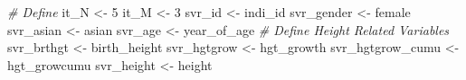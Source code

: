 \documentclass[
]{book}
\newenvironment{Shaded}{\begin{snugshade}}{\end{snugshade}}
\newcommand{\CommentTok}[1]{\textcolor[rgb]{0.56,0.35,0.01}{\textit{#1}}}
\newcommand{\DecValTok}[1]{\textcolor[rgb]{0.00,0.00,0.81}{#1}}
\newcommand{\NormalTok}[1]{#1}
\newcommand{\OtherTok}[1]{\textcolor[rgb]{0.56,0.35,0.01}{#1}}
\newcommand{\StringTok}[1]{\textcolor[rgb]{0.31,0.60,0.02}{#1}}
\begin{document}
\begin{Shaded}
\begin{Highlighting}[]
\CommentTok{\# Define}
\NormalTok{it\_N }\OtherTok{\textless{}{-}} \DecValTok{5}
\NormalTok{it\_M }\OtherTok{\textless{}{-}} \DecValTok{3}
\NormalTok{svr\_id }\OtherTok{\textless{}{-}} \StringTok{\textquotesingle{}indi\_id\textquotesingle{}}
\NormalTok{svr\_gender }\OtherTok{\textless{}{-}} \StringTok{\textquotesingle{}female\textquotesingle{}}
\NormalTok{svr\_asian }\OtherTok{\textless{}{-}} \StringTok{\textquotesingle{}asian\textquotesingle{}}
\NormalTok{svr\_age }\OtherTok{\textless{}{-}} \StringTok{\textquotesingle{}year\_of\_age\textquotesingle{}}
\CommentTok{\# Define Height Related Variables}
\NormalTok{svr\_brthgt }\OtherTok{\textless{}{-}} \StringTok{\textquotesingle{}birth\_height\textquotesingle{}}
\NormalTok{svr\_hgtgrow }\OtherTok{\textless{}{-}} \StringTok{\textquotesingle{}hgt\_growth\textquotesingle{}}
\NormalTok{svr\_hgtgrow\_cumu }\OtherTok{\textless{}{-}} \StringTok{\textquotesingle{}hgt\_growcumu\textquotesingle{}}
\NormalTok{svr\_height }\OtherTok{\textless{}{-}} \StringTok{\textquotesingle{}height\textquotesingle{}}


\end{Highlighting}
\end{Shaded}
\end{document}
